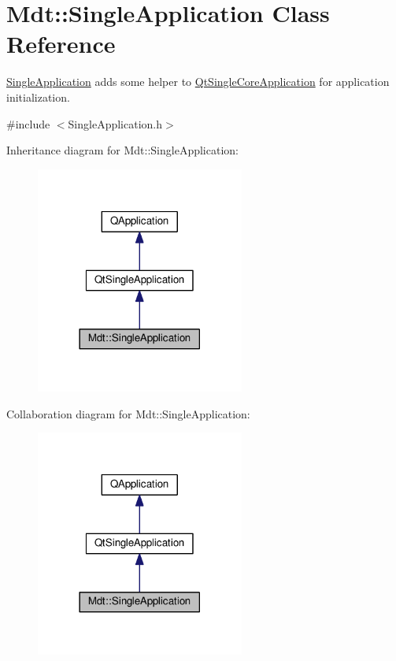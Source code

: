 \hypertarget{class_mdt_1_1_single_application}{}\section{Mdt\+:\+:Single\+Application Class Reference}
\label{class_mdt_1_1_single_application}


\hyperlink{class_mdt_1_1_single_application}{Single\+Application} adds some helper to \hyperlink{class_qt_single_core_application}{Qt\+Single\+Core\+Application} for application initialization.  




{\ttfamily \#include $<$Single\+Application.\+h$>$}



Inheritance diagram for Mdt\+:\+:Single\+Application\+:
\nopagebreak
\begin{figure}[H]
\begin{center}
\leavevmode
\includegraphics[width=194pt]{class_mdt_1_1_single_application__inherit__graph}
\end{center}
\end{figure}


Collaboration diagram for Mdt\+:\+:Single\+Application\+:
\nopagebreak
\begin{figure}[H]
\begin{center}
\leavevmode
\includegraphics[width=194pt]{class_mdt_1_1_single_application__coll__graph}
\end{center}
\end{figure}
